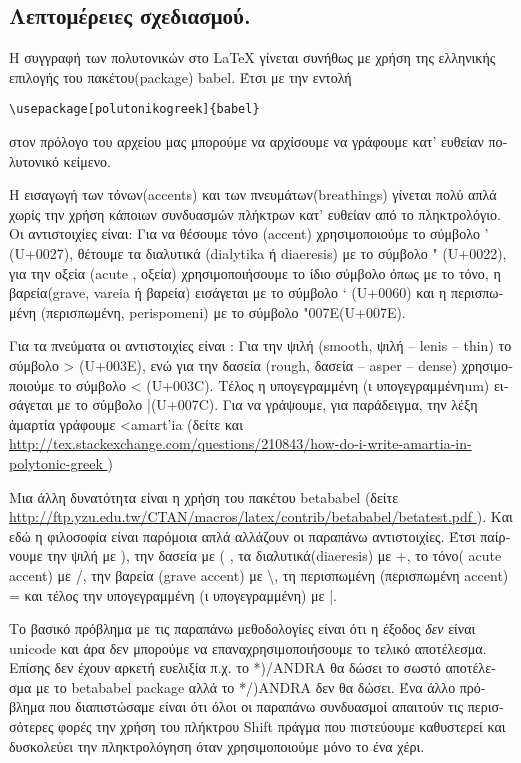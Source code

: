 \documentclass{article}
\let\tb=\textbackslash
\begin{document}
\begin{greek}
\section{\textgreek{Λεπτομέρειες σχεδιασμού.}}

H συγγραφή των πολυτονικών στο \LaTeX{} γίνεται συνήθως με χρήση της ελληνικής επιλογής του πακέτου(package) \textsf{babel}. Έτσι με την εντολή 
\begin{center} \verb'\usepackage[polutonikogreek]{babel}' \end{center}
 στον πρόλογο του αρχείου μας μπορούμε να αρχίσουμε να γράφουμε κατ’ ευθείαν πολυτονικό κείμενο. 
 
Η εισαγωγή των τόνων(accents) και των πνευμάτων(breathings) γίνεται πολύ απλά χωρίς την χρήση κάποιων συνδυασμών πλήκτρων κατ’ ευθείαν  από το πληκτρολόγιο. Οι αντιστοιχίες είναι: 
Για να θέσουμε τόνο (accent) χρησιμοποιούμε  το σύμβολο ' (U+0027),  θέτουμε τα διαλυτικά (dialytika  ή diaeresis) με το σύμβολο " (U+0022),   για την  οξεία (acute , οξεία) χρησιμοποιήσουμε  το ίδιο σύμβολο όπως με το τόνο, η  βαρεία(grave, vareia ή βαρεία) εισάγεται με το σύμβολο ` (U+0060) και η περισπωμένη (περισπωμένη, perispomeni) με το σύμβολο  \char"007E{}(U+007E). 

Για τα πνεύματα οι αντιστοιχίες είναι :
Για την ψιλή (smooth,  ψιλή – lenis – thin) το  σύμβολο > (U+003E), ενώ για την δασεία (rough, δασεία – asper – dense) χρησιμοποιούμε το σύμβολο < (U+003C). Τέλος η υπογεγραμμένη (ι υπογεγραμμένηum) εισάγεται με το σύμβολο |(U+007C). Για να γράψουμε, για παράδειγμα,  την λέξη  ἁμαρτία γράφουμε <amart'ia (δείτε και  \url{http://tex.stackexchange.com/questions/210843/how-do-i-write-amartia-in-polytonic-greek } )

Μια άλλη δυνατότητα είναι η χρήση του πακέτου \textsf{betababel} (δείτε \url{http://ftp.yzu.edu.tw/CTAN/macros/latex/contrib/betababel/betatest.pdf }). Και εδώ η φιλοσοφία είναι παρόμοια απλά αλλάζουν οι παραπάνω αντιστοιχίες. Έτσι παίρνουμε την  ψιλή με  ), την 
δασεία με ( , τα διαλυτικά(diaeresis) με  +, το τόνο( acute accent) με /, την βαρεία (grave accent) με  \tb, τη περισπωμένη (περισπωμένη accent) = και τέλος την υπογεγραμμένη (ι υπογεγραμμένη) με  |.


 Το βασικό πρόβλημα με τις παραπάνω μεθοδολογίες είναι ότι η έξοδος \emph{δεν} είναι {\sf unicode} και άρα δεν μπορούμε να επαναχρησιμοποιήσουμε το τελικό αποτέλεσμα.  Επίσης δεν έχουν αρκετή ευελιξία π.χ. το *)/ANDRA θα δώσει το σωστό αποτέλεσμα με το betababel package αλλά το */)ANDRA δεν θα δώσει. Ένα άλλο πρόβλημα που διαπιστώσαμε είναι ότι όλοι οι παραπάνω συνδυασμοί απαιτούν τις περισσότερες φορές  την χρήση του πλήκτρου {\sf Shift} πράγμα που πιστεύουμε καθυστερεί και δυσκολεύει την πληκτρολόγηση όταν χρησιμοποιούμε μόνο το ένα χέρι. 



\end{greek}
\end{document}
